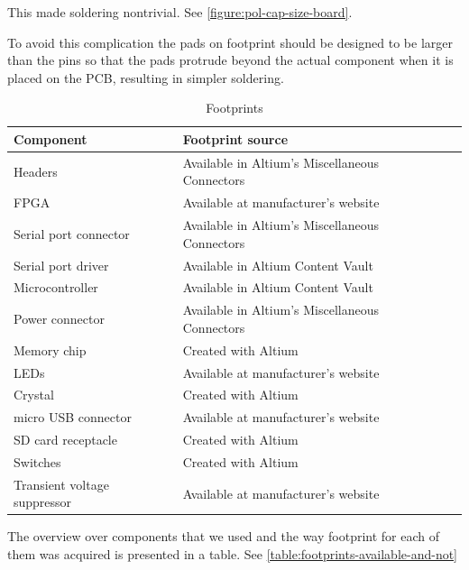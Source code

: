 This made soldering nontrivial.
See \vref{figure:pol-cap-size-board}.

To avoid this complication the pads on footprint should be designed to be larger than the pins so that the pads protrude beyond the actual component when it is placed on the PCB, resulting in simpler soldering.

 \begin{table}[H]
 \begin{center}
 \begin{tabular}{| l | l | l |}
 \hline
 Component & Footprint source\\
 \hline
 Headers & Available in Altium's Miscellaneous Connectors \\
 FPGA & Available at manufacturer's website \\
 Serial port connector & Available in Altium's Miscellaneous Connectors \\
 Serial port driver & Available in Altium Content Vault \\
 Microcontroller & Available in Altium Content Vault \\
 Power connector &  Available in Altium's Miscellaneous Connectors\\
 Memory chip & Created with Altium \\
 LEDs &  Available at manufacturer's website\\
 Crystal &  Created with Altium \\
 micro USB connector & Available at manufacturer's website \\
 SD card receptacle & Created with Altium \\
 Switches & Created with Altium \\
 Transient voltage suppressor & Available at manufacturer's website \\
 \hline
 \end{tabular}
 \caption{Footprints}
 \label{table:footprints-available-and-not}
 \end{center}
 \end{table}


The overview over components that we used and the way footprint for each of them was acquired is presented in a table. See \vref{table:footprints-available-and-not}